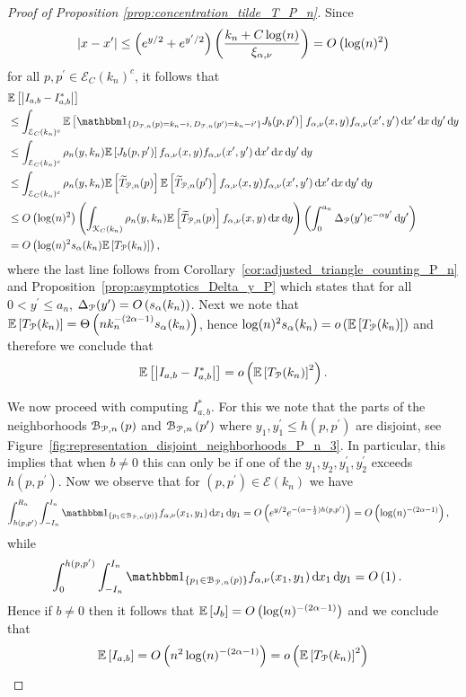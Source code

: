 \begin{proof}[Proof of Proposition \ref{prop:concentration_tilde_T_P_n}]
Since 
\[
	|x - x^\prime| \le \left(e^{y/2} + e^{y^\prime/2}\right)\left(\frac{k_n + C \log(n)}{\xi_{\alpha,\nu}}\right)
	= O\left(\log(n)^2\right)
\] 
for all $p,p ^\prime \in \mathcal{E}_C(k_n)^c$, it follows that
\begin{align*}
	&\Exp{\left|I_{a,b} - I^\ast_{a,b}\right|} \\
	&\le \int_{\mathcal{E}_{C}(k_n)^c} 
		\Exp{\ind{D_{\Pcal,n}(p) = k_n - i, \, D_{\Pcal,n}(p^\prime) = k_n - i^\prime} J_b(p,p^\prime)}
		f_{\alpha,\nu}(x,y) f_{\alpha, \nu}(x^\prime, y^\prime) \dd x^\prime \dd x \dd y^\prime \dd y\\
	&\le \int_{\mathcal{E}_{C}(k_n)^c} \rho_{n}(y,k_n) \Exp{J_b(p,p^\prime)}
		f_{\alpha,\nu}(x,y) f_{\alpha, \nu}(x^\prime, y^\prime) \dd x^\prime \dd x \dd y^\prime \dd y\\
	&\le \int_{\mathcal{E}_{C}(k_n)^c} \rho_{n}(y,k_n) \Exp{\widetilde{T}_{\Pcal,n}(p)}
		\Exp{\widetilde{T}_{\Pcal,n}(p^\prime)} 
		f_{\alpha,\nu}(x,y) f_{\alpha, \nu}(x^\prime, y^\prime) \dd x^\prime \dd x \dd y^\prime \dd y\\
	&\le \bigO{\log(n)^2} \left(\int_{\Kcal_{C}(k_n)} \rho_{n}(y,k_n) \Exp{\widetilde{T}_{\Pcal,n}(p)} 
		f_{\alpha, \nu}(x,y) \dd x \dd y\right)	
		\left(\int_0^{a_n} \Delta_\Pcal(y^\prime) e^{-\alpha y^\prime} \dd y^\prime\right) \\
	&= \bigO{\log(n)^2 s_\alpha(k_n) \Exp{T_\Pcal(k_n)}},
\end{align*}
where the last line follows from Corollary~\ref{cor:adjusted_triangle_counting_P_n} and Proposition~\ref{prop:asymptotics_Delta_y_P} which states that for all $0 < y^\prime \le a_n$, $\Delta_{{\mathcal P}}(y^\prime) = O\left(s_\alpha(k_n)\right)$. Next we note that $\mathbb{E}\left[T_{{\mathcal P}}(k_n)\right] = \Theta\left(n k_n^{-(2\alpha - 1)} s_\alpha(k_n)\right)$, hence $\log(n)^2 s_\alpha(k_n) = o\left(\mathbb{E}\left[T_{{\mathcal P}}(k_n)\right]\right)$ and therefore we conclude that
\[
	\mathbb{E}\left[\left|I_{a,b} - I^\ast_{a,b}\right|\right] = o\left(\mathbb{E}\left[T_{{\mathcal P}}(k_n)\right]^2\right).
\]

We now proceed with computing $I_{a,b}^\ast$. For this we note that the parts of the neighborhoods ${\mathcal B}_{{\mathcal P},n}\left(p\right)$ and ${\mathcal B}_{{\mathcal P},n}\left(p^\prime\right)$ where $y_1, y_1^\prime \le h(p,p^\prime)$ are disjoint, see Figure~\ref{fig:representation_disjoint_neighborhoods_P_n_3}. In particular, this implies that when $b \ne 0$ this can only be if one of the $y_1, y_2, y_1^\prime, y_2^\prime$ exceeds $h(p,p^\prime)$. Now we observe that for $(p,p^\prime) \in \mathcal{E}(k_n)$ we have
\begin{align*}
	\int_{h(p,p^\prime)}^{R_n}\int_{-I_n}^{I_n} \ind{p_1 \in \BallPon{p}} f_{\alpha,\nu}(x_1,y_1) \dd x_1 \dd y_1
	&= \bigO{e^{y/2} e^{-(\alpha - \frac{1}{2})h(p,p^\prime)}}
		= \bigO{\log(n)^{-(2\alpha - 1)}},
\end{align*}
while
\begin{align*}
	\int_0^{h(p,p^\prime)}\int_{-I_n}^{I_n} \ind{p_1 \in \BallPon{p}} f_{\alpha,\nu}(x_1,y_1) \dd x_1 \dd y_1
	&= \bigO{1}.
\end{align*} 
Hence if $b \ne 0$ then it follows that $\mathbb{E}\left[J_b\right] = O\left(\log(n)^{-(2\alpha - 1)}\right)$ and we conclude that 
\[
	\mathbb{E}\left[I_{a,b}\right] = O\left(n^2 \log(n)^{-(2\alpha - 1)}\right) = o\left(\mathbb{E}\left[T_{{\mathcal P}}(k_n)\right]^2\right)
\]


\end{proof}
